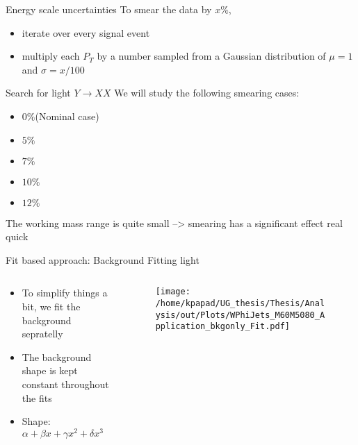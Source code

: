 \documentclass[bigger]{beamer}
\begin{document}
\begin{frame}[label={sec:org76e02e7}]{Energy scale uncertainties}
To smear the data by \(x\%\),
\begin{itemize}
\item iterate over every signal event
\item multiply each \(P_{T}\) by a number sampled from a Gaussian distribution of \(\mu = 1\) and \(\sigma = x/100\)
\end{itemize}
\end{frame}
\begin{frame}[label={sec:org33aa9dc}]{Search for light \(Y \rightarrow XX\)}
We will study the following smearing cases:
\begin{itemize}
\item \(0\%\)(Nominal case)
\item \(5\%\)
\item \(7\%\)
\item \(10\%\)
\item \(12\%\)
\end{itemize}
The working mass range is quite small --> smearing has a significant effect real quick 
\end{frame}
\begin{frame}[label={sec:org7c8b1f0}]{Fit based approach: Background Fitting light}
\begin{columns}
\begin{column}{0.5\columnwidth}
\begin{itemize}
\item To simplify things a bit, we fit the background sepratelly
\item The background shape is kept constant throughout the fits
\item Shape: \(\alpha + \beta x + \gamma x^2 + \delta x^3\)
\end{itemize}
\end{column}
\begin{column}{0.5\columnwidth}
\begin{figure}[h]
\centering
\texttt{[image: /home/kpapad/UG\_thesis/Thesis/Analysis/out/Plots/WPhiJets\_M60M5080\_Application\_bkgonly\_Fit.pdf]}
\end{figure}
\end{column}
\end{columns}
\end{frame}
\end{document}
